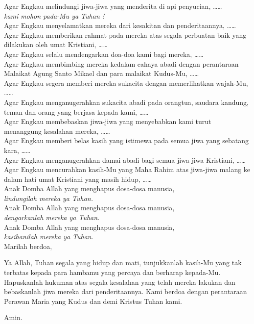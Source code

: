 \documentclass[12pt,a4paper]{article}
\begin{document}
Agar Engkau melindungi jiwa-jiwa
yang menderita di api penyucian, \ldots\ldots\\
\textit{\hspace*{5mm}kami mohon pada-Mu ya Tuhan !}\\
Agar Engkau menyelamatkan mereka dari kesakitan dan penderitaannya, \ldots\ldots\\
Agar Engkau memberikan rahmat pada mereka
atas segala perbuatan baik yang dilakukan oleh umat Kristiani, \ldots\ldots\\
Agar Engkau selalu mendengarkan doa-doa kami bagi mereka, \ldots\ldots\\
Agar Engkau membimbing mereka kedalam cahaya abadi
dengan perantaraan Malaikat Agung Santo Mikael
dan para malaikat Kudus-Mu, \ldots\ldots\\
Agar Engkau segera memberi mereka sukacita
dengan memerlihatkan wajah-Mu, \ldots\ldots\\
Agar Engkau menganugerahkan sukacita abadi pada orangtua,
saudara kandung, teman dan orang yang berjasa kepada kami, \ldots\ldots\\
Agar Engkau membebaskan jiwa-jiwa
yang menyebabkan kami turut menanggung kesalahan mereka, \ldots\ldots\\
Agar Engkau memberi belas kasih yang istimewa
pada semua jiwa yang sebatang kara, \ldots\ldots\\
Agar Engkau menganugerahkan damai abadi
bagi semua jiwa-jiwa Kristiani, \ldots\ldots\\
Agar Engkau mencurahkan kasih-Mu yang Maha Rahim
atas jiwa-jiwa malang ke dalam hati umat Kristiani yang masih hidup, \ldots\ldots\\

Anak Domba Allah yang menghapus dosa-dosa manusia,\\
\textit{\hspace*{5mm}lindungilah mereka ya Tuhan.}\\
Anak Domba Allah yang menghapus dosa-dosa manusia,\\ \textit{\hspace*{5mm}dengarkanlah mereka ya Tuhan.}\\
Anak Domba Allah yang menghapus dosa-dosa manusia,\\ \textit{\hspace*{5mm}kasihanilah  mereka ya Tuhan.}\\


Marilah berdoa,

Ya Allah, Tuhan segala yang hidup dan mati,
tunjukkanlah kasih-Mu yang tak terbatas
kepada para hambamu yang percaya dan berharap kepada-Mu.
Hapuskanlah hukuman atas segala kesalahan
yang telah mereka lakukan
dan bebaskanlah jiwa mereka dari penderitaannya.
Kami berdoa dengan perantaraan Perawan Maria yang Kudus
dan demi Kristus Tuhan kami. 

Amin.	
\end{document}
